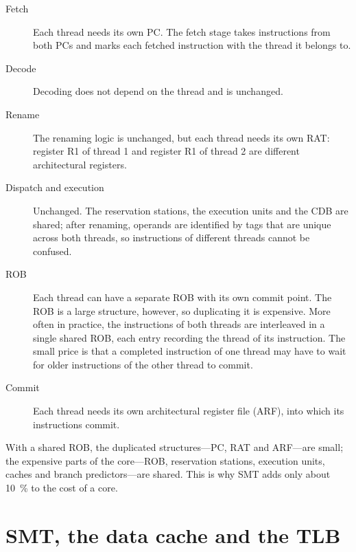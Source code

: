 \documentclass[../main.tex]{subfiles}
\begin{document}
\begin{description}
  \item[Fetch] Each thread needs its own PC.  The fetch stage takes
    instructions from both PCs and marks each fetched instruction with the
    thread it belongs to.
  \item[Decode] Decoding does not depend on the thread and is unchanged.
  \item[Rename] The renaming logic is unchanged, but each thread needs its
    own RAT: register R1 of thread 1 and register R1 of thread 2 are
    different architectural registers.
  \item[Dispatch and execution] Unchanged.  The reservation stations, the
    execution units and the CDB are shared; after renaming, operands are
    identified by tags that are unique across both threads, so instructions
    of different threads cannot be confused.
  \item[ROB] Each thread can have a separate ROB with its own commit point.
    The ROB is a large structure, however, so duplicating it is expensive.
    More often in practice, the instructions of both threads are interleaved
    in a single shared ROB, each entry recording the thread of its
    instruction.  The small price is that a completed instruction of one
    thread may have to wait for older instructions of the other thread to
    commit.
  \item[Commit] Each thread needs its own architectural register file (ARF),
    into which its instructions commit.
\end{description}

With a shared ROB, the duplicated structures---PC, RAT and ARF---are small;
the expensive parts of the core---ROB, reservation stations, execution
units, caches and branch predictors---are shared.  This is why SMT adds
only about \SI{10}{\percent} to the cost of a core.

\section{SMT, the data cache and the TLB}
\label{sec:l18-smt-tlb}
\end{document}

